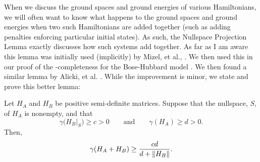\documentclass[../thesis-main/thesis-main]{subfiles}
\begin{document}
When we discuss the ground spaces and ground energies of various Hamiltonians, we will often want to know what happens to the ground spaces and ground energies when two such Hamiltonians are added together (such as adding penalties enforcing particular initial states).  As such, the Nullspace Projection Lemma exactly discusses how such systems add together.  As far as I am aware this lemma was initially used (implicitly) by Mizel, et al., \cite{MLM99}.  We then used this in our proof of the \QMA-completeness for the Bose-Hubbard model \cite{BHQMA}.  We then found a similar lemma by Alicki, et al. \cite{AFH09}.  While the improvement is minor, we state and prove this better lemma:
\begin{lemma}
Let $H_A$ and $H_B$ be positive semi-definite matrices.  Suppose that the nullspace, $S$, of $H_A$ is nonempty, and that 
\begin{equation}
  \gamma\big(H_B|_S\big) \geq c > 0 \qquad \text{and} \qquad \gamma(H_A) \geq d > 0.
\end{equation}
Then,
\begin{equation}
  \gamma(H_A + H_B) \geq \frac{c d}{d + \|{H_B}\|} .
\end{equation}
\label{lem:NPL}
\end{lemma}
\end{document}
